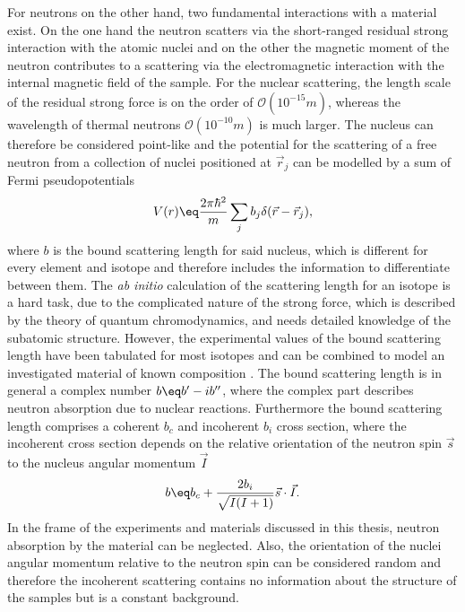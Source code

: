 \documentclass[\main/dresen_thesis.tex]{subfiles}
\begin{document}
    For neutrons on the other hand, two fundamental interactions with a material exist.
    On the one hand the neutron scatters via the short-ranged residual strong interaction with the atomic nuclei and on the other the magnetic moment of the neutron contributes to a scattering via the electromagnetic interaction with the internal magnetic field of the sample.
    For the nuclear scattering, the length scale of the residual strong force is on the order of $\mathcal{O} (10^{-15} \unit{m})$, whereas the wavelength of thermal neutrons $\mathcal{O} (10^{-10} \unit{m})$ is much larger.
    The nucleus can therefore be considered point-like and the potential for the scattering of a free neutron from a collection of nuclei positioned at $\vec{r}_j$ can be modelled by a sum of Fermi pseudopotentials
    \begin{align}
      V(r) \eq \frac{2 \pi \hbar^2}{m} \sum_j b_j \delta(\vec{r} - \vec{r}_j),\label{eq:theoreticalBackground:scattering:scatteringTheory:neutronScatteringPotentialSum}
    \end{align}
    where $b$ is the bound scattering length for said nucleus, which is different for every element and isotope and therefore includes the  information to differentiate between them.
    The \textit{ab initio} calculation of the scattering length for an isotope is a hard task, due to the complicated nature of the strong force, which is described by the theory of quantum chromodynamics, and needs detailed knowledge of the subatomic structure.
    However, the experimental values of the bound scattering length have been tabulated for most isotopes and can be combined to model an investigated material of known composition \cite{Sears_1992_Neutr}.
    The bound scattering length is in general a complex number $b \eq b^\prime - i b^{\prime \prime}$, where the complex part describes neutron absorption due to nuclear reactions.
    Furthermore the bound scattering length comprises a coherent $b_c$ and incoherent $b_i$ cross section, where the incoherent cross section depends on the relative orientation of the neutron spin $\vec{s}$ to the nucleus angular momentum $\vec{I}$
    \begin{align}
      b \eq b_c + \frac{2 b_i}{\sqrt{I(I+1)}} \vec{s} \cdot \vec{I}.
    \end{align}
    In the frame of the experiments and materials discussed in this thesis, neutron absorption by the material can be neglected.
    Also, the orientation of the nuclei angular momentum relative to the neutron spin can be considered random and therefore the incoherent scattering contains no information about the structure of the samples but is a constant background.
\end{document}
